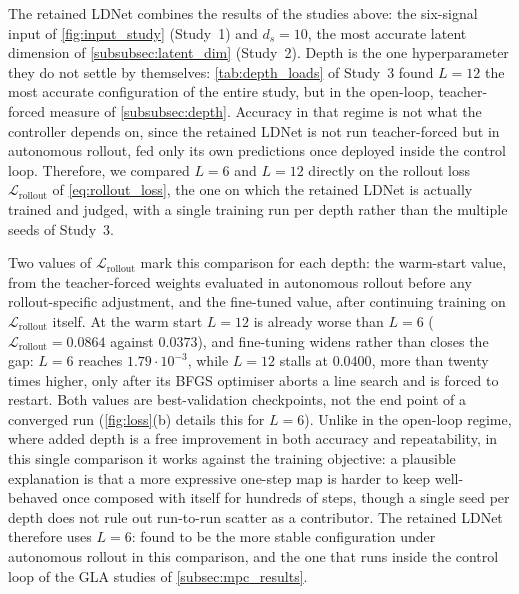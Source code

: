 The retained LDNet combines the results of the studies above: the six-signal input of
\cref{fig:input_study} (Study~1) and $d_s=10$, the most accurate latent dimension of
\cref{subsubsec:latent_dim} (Study~2). Depth is the one hyperparameter they do not settle by themselves:
\cref{tab:depth_loads} of Study~3 found $L=12$ the most accurate configuration of the entire study, but in
the open-loop, teacher-forced measure of \cref{subsubsec:depth}. Accuracy in that regime is
not what the controller depends on, since the retained LDNet is not run teacher-forced but in
autonomous rollout, fed only its own predictions once deployed inside the control loop.
Therefore, we compared $L=6$ and $L=12$ directly on the rollout loss
$\mathcal{L}_\mathrm{rollout}$ of \eqref{eq:rollout_loss}, the one on which the retained
LDNet is actually trained and judged, with a single training run per depth rather than
the multiple seeds of Study~3.

Two values of $\mathcal{L}_\mathrm{rollout}$ mark this comparison for each depth: the
warm-start value, from the teacher-forced weights evaluated in autonomous rollout before
any rollout-specific adjustment, and the fine-tuned value, after continuing training on
$\mathcal{L}_\mathrm{rollout}$ itself. At the warm start $L=12$ is already worse than
$L=6$ ($\mathcal{L}_\mathrm{rollout}=0.0864$ against $0.0373$), and fine-tuning widens
rather than closes the gap: $L=6$ reaches $1.79\cdot10^{-3}$, while $L=12$ stalls at
$0.0400$, more than twenty times higher, only after its BFGS optimiser aborts a line
search and is forced to restart. Both values are best-validation checkpoints, not the
end point of a converged run (\cref{fig:loss}(b) details this for $L=6$). Unlike in the open-loop regime, where added depth is a free improvement
in both accuracy and repeatability, in this single comparison it works against the training
objective: a plausible explanation is that a more expressive one-step map is harder to keep
well-behaved once composed with itself for hundreds of steps, though a single seed per depth
does not rule out run-to-run scatter as a contributor. The retained LDNet therefore uses $L=6$: found to be the more stable configuration under autonomous rollout in this comparison, and the one that runs inside the
control loop of the GLA studies of \cref{subsec:mpc_results}.


